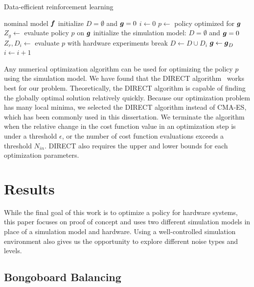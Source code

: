 \begin{algorithm}[t]
\caption{Data-efficient reinforcement learning}
\label{alg:learning_learning}
\begin{algorithmic}[1]
\REQUIRE nominal model $\mbox{\boldmath \(f\)}$
\STATE initialize $D=\emptyset$ and $\mbox{\boldmath \(g\)} = 0$ 
\STATE $i \leftarrow 0$
\STATE $p \leftarrow$ policy optimized for $\mbox{\boldmath \(g\)}$
\STATE $Z_g \leftarrow$ evaluate policy $p$ on $\mbox{\boldmath \(g\)}$
\STATE initialize the simulation model: $D=\emptyset$ and $\mbox{\boldmath \(g\)} = 0$
\ENDIF
\STATE $Z_r, D_i \leftarrow$ evaluate $p$ with hardware experiments
\STATE break
\ENDIF
\STATE $D \leftarrow D \cup D_i$
\STATE $\mbox{\boldmath \(g\)} \leftarrow \mbox{\boldmath \(g\)}_D$ 
\STATE $i \leftarrow i+1$
\ENDWHILE
\end{algorithmic}
\end{algorithm}

Any numerical optimization algorithm can be used for optimizing the
policy $p$ using the simulation model.
We have found that the DIRECT algorithm~\cite{bib-jones-direct} works
best for our problem.
Theoretically, the DIRECT algorithm is capable of finding the globally
optimal solution relatively quickly.
Because our optimization problem has many local minima,
we selected the DIRECT algorithm instead of CMA-ES, which has been commonly
used in this dissertation.
We terminate the algorithm when the relative change in the cost function
value in an optimization step is under a threshold $\epsilon$, or the
number of cost function evaluations exceeds a threshold $N_{in}$.
DIRECT also requires the upper and lower bounds for each optimization
parameters.

\section{Results}  \label{sec:learning_results}

While the final goal of this work is to optimize a policy for hardware
systems, this paper focuses on proof of concept and uses two different
simulation models in place of a simulation model and hardware.
Using a well-controlled simulation environment also gives us the
opportunity to explore different noise types and levels.

\subsection{Bongoboard Balancing}

